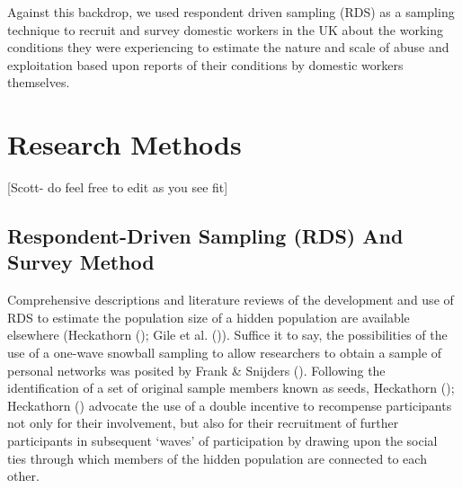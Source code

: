 \documentclass[
  12pt,
]{article}
\theoremstyle{plain}
\theoremstyle{definition}
\begin{document}
Against this backdrop, we used respondent driven sampling (RDS) as a
sampling technique to recruit and survey domestic workers in the UK
about the working conditions they were experiencing to estimate the
nature and scale of abuse and exploitation based upon reports of their
conditions by domestic workers themselves.

\section{Research Methods}\label{research-methods}

{[}Scott- do feel free to edit as you see fit{]}

\subsection{Respondent-Driven Sampling (RDS) And Survey
Method}\label{respondent-driven-sampling-rds-and-survey-method}

Comprehensive descriptions and literature reviews of the development and
use of RDS to estimate the population size of a hidden population are
available elsewhere (Heckathorn
(); Gile et al.
()). Suffice it to say, the
possibilities of the use of a one-wave snowball sampling to allow
researchers to obtain a sample of personal networks was posited by Frank
\& Snijders (). Following the
identification of a set of original sample members known as seeds,
Heckathorn ();
Heckathorn ()
advocate the use of a double incentive to recompense participants not
only for their involvement, but also for their recruitment of further
participants in subsequent `waves' of participation by drawing upon the
social ties through which members of the hidden population are connected
to each other.
\end{document}
